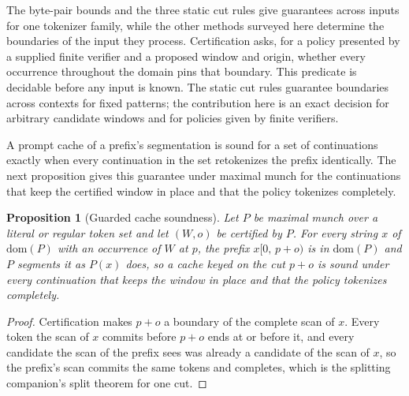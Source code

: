 \documentclass[11pt,a4paper]{article}
\theoremstyle{definition}
\theoremstyle{plain}
\newtheorem{proposition}{Proposition}
\begin{document}
The byte-pair bounds and the three static cut rules give guarantees across inputs for one tokenizer family, while the
other methods surveyed here determine the boundaries of the input they process. Certification asks, for a policy
presented by a supplied finite verifier and a proposed window and origin, whether every occurrence throughout the domain
pins that boundary. This predicate is decidable before any input is known. The static cut rules guarantee boundaries
across contexts for fixed patterns; the contribution here is an exact decision for arbitrary candidate windows and for
policies given by finite verifiers.

A prompt cache of a prefix's segmentation is sound for a set of continuations exactly when every continuation in the set
retokenizes the prefix identically. The next proposition gives this guarantee under maximal munch for the continuations
that keep the certified window in place and that the policy tokenizes completely.

\begin{proposition}[Guarded cache soundness]\label{prop:cache} Let $P$ be maximal munch over a literal or regular token
set and let $(W,o)$ be certified by $P$. For every string $x$ of $\mathrm{dom}(P)$ with an occurrence of $W$ at $p$, the
prefix $x[0,\,p+o)$ is in $\mathrm{dom}(P)$ and $P$ segments it as $P(x)$ does, so a cache keyed on the cut $p+o$ is
sound under every continuation that keeps the window in place and that the policy tokenizes completely.
\end{proposition}

\begin{proof}
Certification makes $p + o$ a boundary of the complete scan of $x$. Every token the scan of $x$ commits before $p + o$
ends at or before it, and every candidate the scan of the prefix sees was already a candidate of the scan of $x$, so the
prefix's scan commits the same tokens and completes, which is the splitting companion's split theorem
\citep{nidhogg2026splitting} for one cut.
\end{proof}
\end{document}
